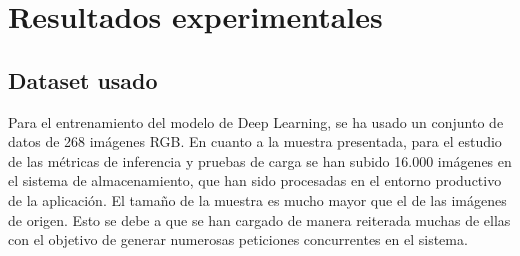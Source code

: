 \mbox{}
\usepackage{tabularx}
\usepackage{graphicx}
\usepackage{adjustbox}

\chapter{Resultados experimentales}
\label{ch:chapte5}


\section{Dataset usado}\label{sec:dataset-usado}
Para el entrenamiento del modelo de Deep Learning, se ha usado un conjunto de datos de 268 imágenes RGB\@.
En cuanto a la muestra presentada, para el estudio de las métricas de inferencia y pruebas de carga se han subido 16.000 imágenes en el sistema de almacenamiento, que han sido procesadas en el entorno productivo de la aplicación.
El tamaño de la muestra es mucho mayor que el de las imágenes de origen.
Esto se debe a que se han cargado de manera reiterada muchas de ellas con el objetivo de generar numerosas peticiones concurrentes en el sistema.

